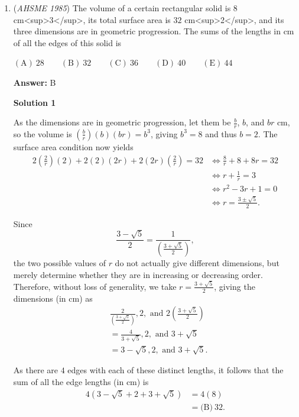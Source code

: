 \begin{enumerate}
 


	\item (\textit{AHSME 1985}) The volume of a certain rectangular solid is $8$ cm<sup>3</sup>, its total surface area is $32$ cm<sup>2</sup>, and its three dimensions are in geometric progression. The sums of the lengths in cm of all the edges of this solid is


 $\mathrm{(A)\ } 28 \qquad \mathrm{(B) \ }32 \qquad \mathrm{(C) \  } 36 \qquad \mathrm{(D) \  } 40 \qquad \mathrm{(E) \  }44$

 \textbf{Answer: }B



\textbf{Solution 1}

As the dimensions are in geometric progression, let them be $\frac{b}{r}$, $b$, and $br$ cm, so the volume is $\left(\frac{b}{r}\right)(b)(br) = b^3$, giving $b^3 = 8$ and thus $b = 2$. The surface area condition now yields 
 \begin{align*}2\left(\frac{2}{r}\right)(2)+2(2)(2r)+2(2r)\left(\frac{2}{r}\right) = 32 &\iff \frac{8}{r}+8+8r = 32 \\ &\iff r+\frac{1}{r} = 3 \\ &\iff r^2-3r+1 = 0 \\ &\iff r = \frac{3 \pm \sqrt{5}}{2}.\end{align*}


 Since 
 \[\frac{3-\sqrt{5}}{2} = \frac{1}{\left(\frac{3+\sqrt{5}}{2}\right)},\] the two possible values of $r$ do not actually give different dimensions, but merely determine whether they are in increasing or decreasing order. Therefore, without loss of generality, we take $r = \frac{3+\sqrt{5}}{2}$, giving the dimensions (in cm) as 
 \begin{align*}&\frac{2}{\left(\frac{3+\sqrt{5}}{2}\right)}, 2, \text{ and } 2\left(\frac{3+\sqrt{5}}{2}\right) \\ &= \frac{4}{3+\sqrt{5}}, 2, \text{ and } 3+\sqrt{5} \\ &= 3-\sqrt{5}, 2, \text{ and } 3+\sqrt{5}.\end{align*}


 As there are $4$ edges with each of these distinct lengths, it follows that the sum of all the edge lengths (in cm) is 
 \begin{align*}4\left(3-\sqrt{5}+2+3+\sqrt{5}\right) &= 4(8) \\ &= \boxed{\text{(B)} \ 32}.\end{align*}






\end{enumerate}
